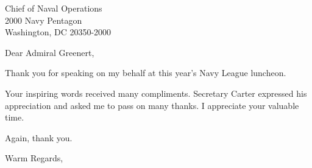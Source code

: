\documentclass[12pt]{wrceletter}
\date{\printdate{2015-02-12}}
\begin{document}
\begin{letter}{%
Chief of Naval Operations\\
2000 Navy Pentagon\\
Washington, DC 20350-2000}

\opening{Dear Admiral Greenert,}
\raggedright %
\setlength{\parindent}{15pt} %

Thank you for speaking on my behalf at this year’s Navy League
luncheon.

Your inspiring words received many compliments. Secretary
Carter expressed his appreciation and asked me to pass on many
thanks. I appreciate your valuable time.
 
Again, thank you.

\closing{Warm Regards,}

\end{letter}
\end{document}

